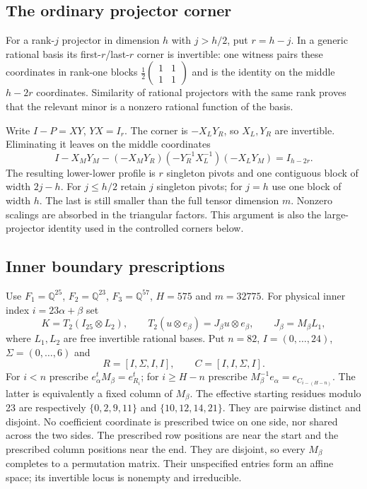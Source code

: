 \subsection{The ordinary projector corner}
For a rank-$j$ projector in dimension $h$ with $j>h/2$, put $r=h-j$.
In a generic rational basis its first-$r$/last-$r$ corner is invertible:
one witness pairs these coordinates in rank-one blocks
$\frac12\left(\begin{smallmatrix}1&1\\1&1\end{smallmatrix}\right)$
and is the identity on the middle $h-2r$ coordinates. Similarity of
rational projectors with the same rank proves that the relevant minor
is a nonzero rational function of the basis.

Write $I-P=XY$, $YX=I_r$. The corner is $-X_LY_R$, so $X_L,Y_R$ are
invertible. Eliminating it leaves on the middle coordinates
\[
 I-X_MY_M-(-X_MY_R)(-Y_R^{-1}X_L^{-1})(-X_LY_M)=I_{h-2r}.
\]
The resulting lower-lower profile is $r$ singleton pivots and one
contiguous block of width $2j-h$. For $j\le h/2$ retain $j$ singleton
pivots; for $j=h$ use one block of width $h$. The last is still smaller
than the full tensor dimension $m$. Nonzero scalings are absorbed in
the triangular factors. This argument is also the large-projector
identity used in the controlled corners below.

\subsection{Inner boundary prescriptions}
Use $F_1=\mathbb Q^{25}$, $F_2=\mathbb Q^{23}$, $F_3=\mathbb Q^{57}$,
$H=575$ and $m=32775$. For physical inner index $i=23\alpha+\beta$ set
\[
 K=T_2(I_{25}\otimes L_2),\qquad
 T_2(u\otimes e_\beta)=J_\beta u\otimes e_\beta,
 \qquad J_\beta=M_\beta L_1,
\]
where $L_1,L_2$ are free invertible rational bases. Put $n=82$,
$I=(0,\ldots,24)$, $\Sigma=(0,\ldots,6)$ and
\[
 R=[I,\Sigma,I,I],\qquad C=[I,I,\Sigma,I].
\]
For $i<n$ prescribe $e_\alpha^tM_\beta=e_{R_i}^t$; for $i\ge H-n$
prescribe $M_\beta^{-1}e_\alpha=e_{C_{i-(H-n)}}$.
The latter is equivalently a fixed column of $M_\beta$.
The effective starting residues modulo 23 are respectively
$\{0,2,9,11\}$ and $\{10,12,14,21\}$.
They are pairwise distinct and disjoint. No coefficient coordinate is
prescribed twice on one side, nor shared across the two sides. The
prescribed row positions are near the start and the prescribed column
positions near the end. They are disjoint, so every $M_\beta$ completes
to a permutation matrix. Their unspecified entries form an affine
space; its invertible locus is nonempty and irreducible.

